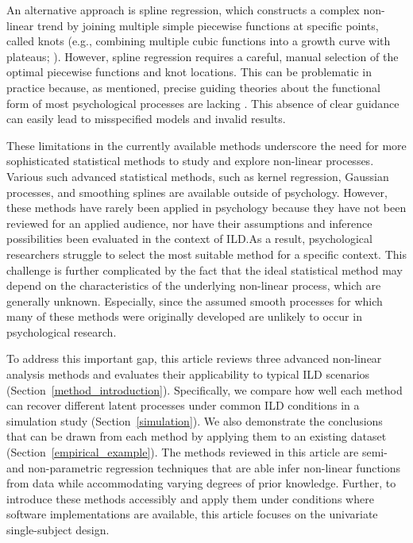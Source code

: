 \documentclass[man, floatsintext]{apa7}
\begin{document}
An alternative approach is spline regression, which constructs a complex
non-linear trend by joining multiple simple piecewise functions at specific
points, called knots (e.g., combining multiple cubic functions into a growth
curve with plateaus; \textcite{tsay_nonlinear_2019}). However, spline
regression requires a careful, manual selection of the optimal piecewise
functions and
knot locations. This can be problematic in practice because, as mentioned,
precise guiding theories about the functional form of most psychological
processes are lacking \parencite{tan_time-varying_2011}. This absence of clear
guidance can easily lead to misspecified models and invalid results.

These limitations in the currently available methods underscore the need for
more sophisticated statistical methods to study and explore non-linear
processes. Various such advanced statistical
methods, such as kernel regression, Gaussian processes, and smoothing splines
are available outside of psychology. However, these
methods have rarely been applied in psychology because they have not been
reviewed for an applied audience, nor have their assumptions and inference
possibilities been evaluated in the context of ILD.\@ As a result,
psychological researchers struggle to select the most suitable method for a
specific context. This challenge is further complicated by the fact that the
ideal statistical method may depend on the characteristics of the underlying
non-linear process, which are generally unknown. Especially, since the assumed
smooth processes for which many of these methods were originally developed are
unlikely to occur in psychological research.

To address this important gap, this article reviews three advanced non-linear
analysis methods and evaluates their applicability to typical ILD scenarios
(Section~\ref{method_introduction}). Specifically, we compare how well
each method can recover different latent processes under common ILD
conditions in a simulation study (Section~\ref{simulation}). We also
demonstrate the conclusions that can be drawn from each method by applying them
to an existing dataset (Section~\ref{empirical_example}). The methods
reviewed in this article are semi- and non-parametric regression techniques
that are able infer non-linear functions from data while accommodating
varying degrees of prior knowledge. Further, to introduce these methods
accessibly and apply them under conditions where software implementations
are available, this article focuses on the univariate single-subject design.
\end{document}
